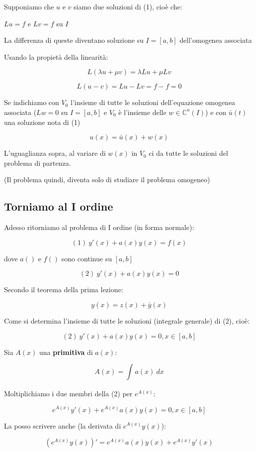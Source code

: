 \documentclass[11pt]{article}
\begin{document}
Supponiamo che $u$ e $v$ siamo due soluzioni di (1), cioè che:

$Lu=f$ e $Lv=f$ su $I$

La differenza di queste diventano soluzione su $I=[a,b]$ dell'omogenea associata

Usando la propietà della linearità:

\[
    L(\lambda u+\mu v) = \lambda L u + \mu L v
\]

\[
    L(u-v) = Lu-Lv = f- f=0
\]

Se indichiamo con $V_0$ l'insieme di tutte le soluzioni dell'equazione omogenea associata ($Lw=0$ su $I=[a,b]$ e $V_0$ è l'insieme delle $w \in \mathbb{C}^n(I)$) e con $\bar u(t)$ una soluzione nota di (1)

\[
    u(x) = \bar u(x) +w(x)
\]

L'uguaglianza sopra, al variare di $w(x)$ in $V_0$ ci da tutte le soluzioni del problema di partenza. 

(Il problema quindi, diventa solo di studiare il problema omogeneo)

\subsection{Torniamo al I ordine}

Adesso ritorniamo al problema di I ordine (in forma normale):

\[
    (1)\ y'(x)+a(x)y(x)=f(x)
\]

dove $a()$ e $f()$ sono continue su $[a,b]$

\[
    (2)\ y'(x)+a(x)y(x)=0
\]

Secondo il teorema della prima lezione:

\[
    y(x)=z(x)+\bar y(x)
\]

Come si determina l'insieme di tutte le soluzioni (integrale generale) di (2), cioè:

\[
    (2)\ y'(x)+a(x)y(x)=0,x \in [a,b]
\]

Sia $A(x)$ una \textbf{primitiva} di $a(x)$:

\[
    A(x) = \int_{{}}^{{}} {a(x)} \: d{x} {}
\]

Moltiplichiamo i due membri della (2) per $e^{A(x)}$:

\[
    e^{A(x)} y'(x) + e ^{A(x)}a(x) y(x)=0, x \in [a,b]
\]

La posso scrivere anche (la derivata di $e ^{A(x)}y(x)$):

\[
    (e ^{A(x)} y(x))' = e ^{A(x)}a(x)y(x) + e ^{A(x)}y'(x)
\]
\end{document}
